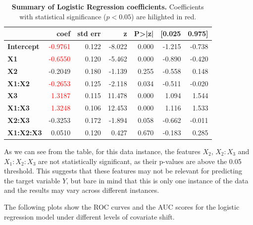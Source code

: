 \vspace{0.5em}

\begin{table}[H]
    \small
    \centering
    \begin{tabular}{lrrrrrr}
        \toprule
        & \textbf{coef} & \textbf{std err} & \textbf{z} & \textbf{P>|z|} & \textbf{[0.025} & \textbf{0.975]} \\
        \midrule
        \textbf{Intercept} & \textcolor{red}{-0.9761} & 0.122 & -8.022 & 0.000 & -1.215 & -0.738 \\
        \textbf{X1}        & \textcolor{red}{-0.6550} & 0.120 & -5.462 & 0.000 & -0.890 & -0.420 \\
        \textbf{X2}        & -0.2049 & 0.180 & -1.139 & 0.255 & -0.558 & 0.148 \\
        \textbf{X1:X2}     & \textcolor{red}{-0.2653} & 0.125 & -2.118 & 0.034 & -0.511 & -0.020 \\
        \textbf{X3}        & \textcolor{red}{1.3187}  & 0.115 & 11.478 & 0.000 & 1.094  & 1.544 \\
        \textbf{X1:X3}     & \textcolor{red}{1.3248}  & 0.106 & 12.453 & 0.000 & 1.116  & 1.533 \\
        \textbf{X2:X3}     & -0.3253 & 0.172 & -1.894 & 0.058 & -0.662 & -0.011 \\
        \textbf{X1:X2:X3}  & 0.0510  & 0.120 & 0.427  & 0.670 & -0.183 & 0.285 \\
        \bottomrule
    \end{tabular}
    \caption{\quad \textbf{Summary of Logistic Regression coefficients.} \newline
	Coefficients with statistical significance ($p < 0.05$) are hilighted in red.}
    \label{tab:regression_results}
\end{table}

As we can see from the table, for this data instance, the features $X_2$, $X_2:X_3$ and $X_1:X_2:X_3$ are not statistically significant, as their p-values are above the 0.05 threshold. This suggests that these features may not be relevant for predicting the target variable $Y$, but bare in mind that this is only one instance of the data and the results may vary across different instances.

The following plots show the ROC curves and the AUC scores for the logistic regression model under different levels of covariate shift.

\vspace{0.2em}

